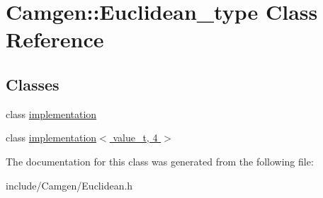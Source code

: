 \hypertarget{a00137}{\section{Camgen\-:\-:Euclidean\-\_\-type Class Reference}
\label{a00137}
}
\subsection*{Classes}
\begin{DoxyCompactItemize}
\item 
class \hyperlink{a00295}{implementation}
\item 
class \hyperlink{a00297}{implementation$<$ value\-\_\-t, 4 $>$}
\end{DoxyCompactItemize}


The documentation for this class was generated from the following file\-:\begin{DoxyCompactItemize}
\item 
include/\-Camgen/Euclidean.\-h\end{DoxyCompactItemize}

